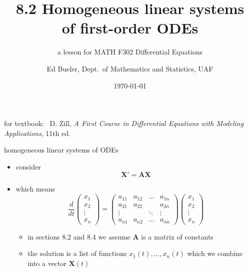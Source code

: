 \documentclass[urlcolor=blue,dvipsnames]{beamer}
\title{8.2 Homogeneous linear systems \\ of first-order ODEs}
\subtitle{a lesson for MATH F302 Differential Equations}
\author{Ed Bueler, Dept.~of Mathematics and Statistics, UAF}
\date{\tiny \today}
\newcommand{\bA}{\mathbf{A}}
\newcommand{\bX}{\mathbf{X}}
\begin{document}
\renewcommand{\thefootnote}{{\color{green} \arabic{footnote}}}

\begin{frame}
\titlepage

\centerline{\tiny for textbook: \, D. Zill, \emph{A First Course in Differential Equations with Modeling Applications}, 11th ed.}
\end{frame}


\begin{frame}{homogeneous linear systems of ODEs}

\begin{itemize}
\item consider
    $$\bX' = \bA \bX$$
\item which means
    $$\frac{d}{dt} \begin{pmatrix} x_1 \\ x_2 \\ \vdots \\ x_n \end{pmatrix} = \begin{pmatrix}
a_{11} & a_{12} & \dots & a_{1n} \\
a_{21} & a_{22} &       & a_{2n} \\
 \vdots&        & \ddots& \vdots \\
a_{n1} & a_{n2} & \dots & a_{nn}
\end{pmatrix}     \begin{pmatrix} x_1 \\ x_2 \\ \vdots \\ x_n \end{pmatrix}$$
    \begin{itemize}
    \item in sections 8.2 and 8.4 we assume $\bA$ is a matrix of constants
    \item the solution is a list of functions $x_1(t),\dots,x_n(t)$ which we combine into a vector $\bX(t)$
    \end{itemize}
\end{itemize}
\end{frame}
\end{document}
